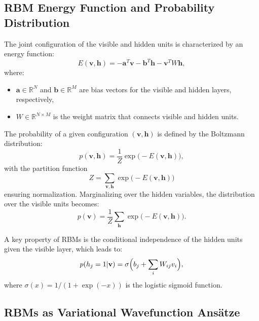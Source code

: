 \subsection{RBM Energy Function and Probability Distribution}

The joint configuration of the visible and hidden units is characterized by an energy function:
\begin{equation}
    E(\mathbf{v}, \mathbf{h}) = -\mathbf{a}^T \mathbf{v} - \mathbf{b}^T \mathbf{h} - \mathbf{v}^T W \mathbf{h},
\end{equation}
where:
\begin{itemize}
    \item $\mathbf{a} \in \mathbb{R}^{N}$ and $\mathbf{b} \in \mathbb{R}^{M}$ are bias vectors for the visible and hidden layers, respectively,
    \item $W \in \mathbb{R}^{N \times M}$ is the weight matrix that connects visible and hidden units.
\end{itemize}

The probability of a given configuration $(\mathbf{v}, \mathbf{h})$ is defined by the Boltzmann distribution:
\begin{equation}
    p(\mathbf{v}, \mathbf{h}) = \frac{1}{Z} \exp\bigl(-E(\mathbf{v}, \mathbf{h})\bigr),
\end{equation}
with the partition function
\begin{equation}
    Z = \sum_{\mathbf{v}, \mathbf{h}} \exp\bigl(-E(\mathbf{v}, \mathbf{h})\bigr)
\end{equation}
ensuring normalization. Marginalizing over the hidden variables, the distribution over the visible units becomes:
\begin{equation}
    p(\mathbf{v}) = \frac{1}{Z} \sum_{\mathbf{h}} \exp\bigl(-E(\mathbf{v}, \mathbf{h})\bigr).
\end{equation}

A key property of RBMs is the conditional independence of the hidden units given the visible layer, which leads to:
\begin{equation}
    p(h_j = 1 | \mathbf{v}) = \sigma\Bigl(b_j + \sum_{i} W_{ij} v_i\Bigr),
\end{equation}
where $\sigma(x) = 1/(1+\exp(-x))$ is the logistic sigmoid function.

\subsection{RBMs as Variational Wavefunction Ans\"atze}

